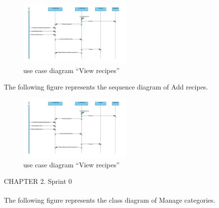 \documentclass{article}
\begin{document}
{{{\begin{figure}[htbp]
    \centering
    \includegraphics[width=0.5\textwidth]{adddia}
    \caption{use case diagram “View recipes”}
    \label{fig:design2}
\end{figure}
The following figure represents the sequence diagram of Add recipes.\\
\begin{figure}[htbp]
    \centering
    \includegraphics[width=0.5\textwidth]{adddia}
    \caption{use case diagram “View recipes”}
    \label{fig:design2}
\end{figure}
\newpage
\noindent
CHAPTER 2.  Sprint 0 \\
\underline{\hspace{\textwidth}} \vspace{0.2cm}\\
The following figure represents the class diagram of Manage categories.\\

}}}
\end{document}
